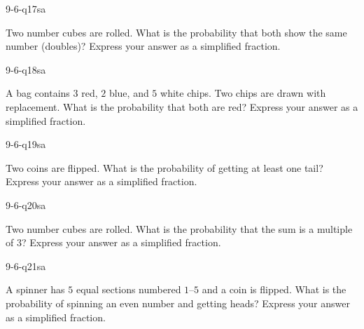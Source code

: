 \begin{practiceQuestion}{9-6-q17}{sa}
\begin{questionText}
Two number cubes are rolled. What is the probability that both show the same number (doubles)? Express your answer as a simplified fraction.
\end{questionText}
\end{practiceQuestion}

\begin{practiceQuestion}{9-6-q18}{sa}
\begin{questionText}
A bag contains $3$ red, $2$ blue, and $5$ white chips. Two chips are drawn with replacement. What is the probability that both are red? Express your answer as a simplified fraction.
\end{questionText}
\end{practiceQuestion}

\begin{practiceQuestion}{9-6-q19}{sa}
\begin{questionText}
Two coins are flipped. What is the probability of getting at least one tail? Express your answer as a simplified fraction.
\end{questionText}
\end{practiceQuestion}

\begin{practiceQuestion}{9-6-q20}{sa}
\begin{questionText}
Two number cubes are rolled. What is the probability that the sum is a multiple of $3$? Express your answer as a simplified fraction.
\end{questionText}
\end{practiceQuestion}

\begin{practiceQuestion}{9-6-q21}{sa}
\begin{questionText}
A spinner has $5$ equal sections numbered $1$--$5$ and a coin is flipped. What is the probability of spinning an even number and getting heads? Express your answer as a simplified fraction.
\end{questionText}
\end{practiceQuestion}

